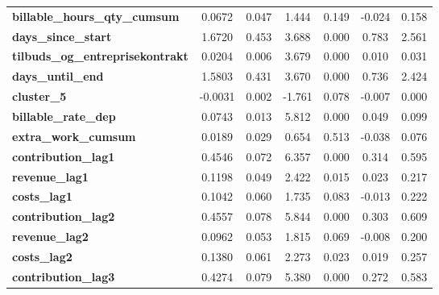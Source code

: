 \begin{center}
\begin{tabular}{lcccccc}
\textbf{billable\_hours\_qty\_cumsum}       &       0.0672  &        0.047     &     1.444  &         0.149        &       -0.024    &        0.158     \\
\textbf{days\_since\_start}                 &       1.6720  &        0.453     &     3.688  &         0.000        &        0.783    &        2.561     \\
\textbf{tilbuds\_og\_entreprisekontrakt}    &       0.0204  &        0.006     &     3.679  &         0.000        &        0.010    &        0.031     \\
\textbf{days\_until\_end}                   &       1.5803  &        0.431     &     3.670  &         0.000        &        0.736    &        2.424     \\
\textbf{cluster\_5}                         &      -0.0031  &        0.002     &    -1.761  &         0.078        &       -0.007    &        0.000     \\
\textbf{billable\_rate\_dep}                &       0.0743  &        0.013     &     5.812  &         0.000        &        0.049    &        0.099     \\
\textbf{extra\_work\_cumsum}                &       0.0189  &        0.029     &     0.654  &         0.513        &       -0.038    &        0.076     \\
\textbf{contribution\_lag1}                 &       0.4546  &        0.072     &     6.357  &         0.000        &        0.314    &        0.595     \\
\textbf{revenue\_lag1}                      &       0.1198  &        0.049     &     2.422  &         0.015        &        0.023    &        0.217     \\
\textbf{costs\_lag1}                        &       0.1042  &        0.060     &     1.735  &         0.083        &       -0.013    &        0.222     \\
\textbf{contribution\_lag2}                 &       0.4557  &        0.078     &     5.844  &         0.000        &        0.303    &        0.609     \\
\textbf{revenue\_lag2}                      &       0.0962  &        0.053     &     1.815  &         0.069        &       -0.008    &        0.200     \\
\textbf{costs\_lag2}                        &       0.1380  &        0.061     &     2.273  &         0.023        &        0.019    &        0.257     \\
\textbf{contribution\_lag3}                 &       0.4274  &        0.079     &     5.380  &         0.000        &        0.272    &        0.583     \\

\end{tabular}
\end{center}
